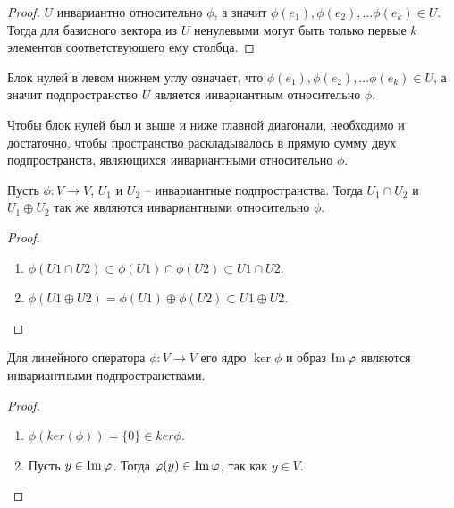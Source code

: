\begin{proof}
    $U$ инвариантно относительно $\phi$, а значит $\phi(e_1), \phi(e_2), \dots \phi(e_k) \in U$.
    Тогда для базисного вектора из $U$ ненулевыми могут быть только первые $k$ элементов 
    соответствующего ему столбца.
\end{proof}

\begin{note}
    Блок нулей в левом нижнем углу означает, что $\phi(e_1), \phi(e_2), \dots \phi(e_k) \in U$, 
    а значит подпространство $U$ является инвариантным относительно $\phi$.
\end{note}

\begin{note}
    Чтобы блок нулей был и выше и ниже главной диагонали, необходимо и достаточно, чтобы 
    пространство раскладывалось в прямую сумму двух подпространств, 
    являющихся инвариантными относительно $\phi$.
\end{note}

\begin{theorem}
    Пусть $\phi: V \to V$, $U_1$ и $U_2$ -- инвариантные подпространства. 
    Тогда $U_1 \cap U_2$ и $U_1 \oplus U_2$ так же являются инвариантными относительно $\phi$.
\end{theorem}

\begin{proof}~
    \begin{enumerate}
        \item $\phi(U1 \cap U2) \subset \phi(U1) \cap \phi(U2) \subset U1 \cap U2$. 
        \item $\phi(U1 \oplus U2) = \phi(U1) \oplus \phi(U2) \subset U1 \oplus U2$.
    \end{enumerate}
\end{proof}

\begin{proposition}
    Для линейного оператора $\phi: V \to V$ его ядро $\ker \phi$ и образ $\operatorname{Im} \varphi$ являются 
    инвариантными подпространствами.
\end{proposition}

\begin{proof}~
    \begin{enumerate}
        \item $\phi(ker (\phi)) = \{0\} \in ker \phi$.
        \item Пусть $y \in \operatorname{Im} \varphi$. Тогда $\varphi(y) \in \operatorname{Im} \varphi$, так как $y \in V$.
    \end{enumerate}
\end{proof}

